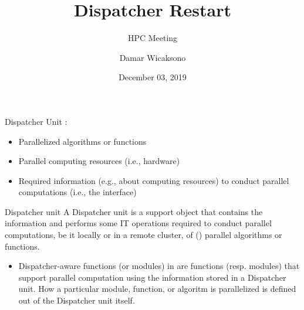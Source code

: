 \documentclass{rsuqbeamernew}
\title[HPC Meeting]{Dispatcher Restart}
\subtitle{HPC Meeting}
\institute[Chair of Risk \& Safety] {}
\author[D. Wicaksono]{Damar Wicaksono}
\date[December 03, 2019] {\small December 03, 2019}
\begin{document}
\begin{frame}[t]{Dispatcher Unit}
  \small
  :
  \begin{itemize}
    \item Parallelized algorithms or functions
    \item Parallel computing resources (i.e., hardware)
    \item Required information (e.g., about computing resources)
    to conduct parallel computations (i.e., the interface)
  \end{itemize}

  \begin{block}{Dispatcher unit}
    A Dispatcher unit is a \uqlab{} support object that {\altx contains}
    the information and {\altx performs} some IT operations required
    to conduct parallel computations, be it locally or in a remote cluster,
    of (\uqlab) parallel algorithms or functions.
  \end{block}
  
  
  \begin{itemize}
    \item[] {\altx Dispatcher-aware} functions (or modules) in \uqlab{}
    are functions (resp. modules) that support parallel computation using
    the information stored in a Dispatcher unit. How a particular module,
    function, or algoritm is parallelized is defined {\altx out of}
    the Dispatcher unit itself.
  \end{itemize}

\end{frame}

\end{document}
